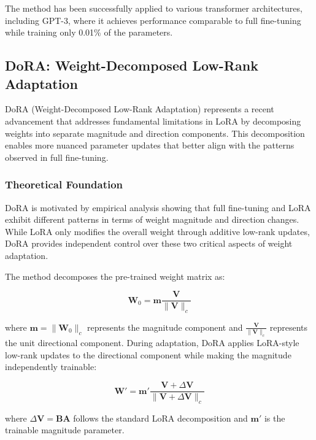 The method has been successfully applied to various transformer architectures, including GPT-3, where it achieves performance comparable to full fine-tuning while training only 0.01\% of the parameters.

\subsection{DoRA: Weight-Decomposed Low-Rank Adaptation}

DoRA (Weight-Decomposed Low-Rank Adaptation) \cite{liu_2024_dora} represents a recent advancement that addresses fundamental limitations in LoRA by decomposing weights into separate magnitude and direction components. This decomposition enables more nuanced parameter updates that better align with the patterns observed in full fine-tuning.

\subsubsection{Theoretical Foundation}

DoRA is motivated by empirical analysis showing that full fine-tuning and LoRA exhibit different patterns in terms of weight magnitude and direction changes. While LoRA only modifies the overall weight through additive low-rank updates, DoRA provides independent control over these two critical aspects of weight adaptation.

The method decomposes the pre-trained weight matrix as:

\begin{equation}
\mathbf{W}_0 = \mathbf{m} \frac{\mathbf{V}}{\|\mathbf{V}\|_c}
\end{equation}

where $\mathbf{m} = \|\mathbf{W}_0\|_c$ represents the magnitude component and $\frac{\mathbf{V}}{\|\mathbf{V}\|_c}$ represents the unit directional component. During adaptation, DoRA applies LoRA-style low-rank updates to the directional component while making the magnitude independently trainable:

\begin{equation}
\mathbf{W}' = \mathbf{m}' \frac{\mathbf{V} + \Delta\mathbf{V}}{\|\mathbf{V} + \Delta\mathbf{V}\|_c}
\end{equation}

where $\Delta\mathbf{V} = \mathbf{B}\mathbf{A}$ follows the standard LoRA decomposition and $\mathbf{m}'$ is the trainable magnitude parameter.

